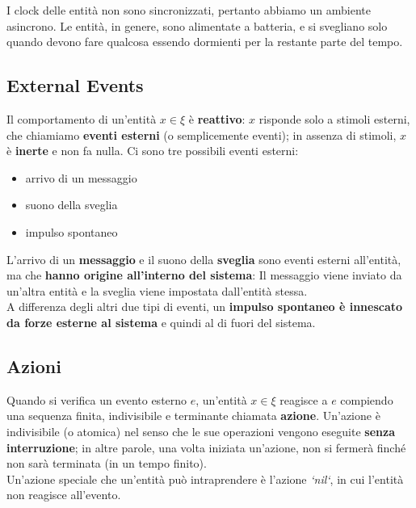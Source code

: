 I clock delle entità non sono sincronizzati, pertanto abbiamo un ambiente asincrono. Le entità, in genere, sono alimentate a batteria, e si svegliano solo quando devono fare qualcosa essendo dormienti per la restante parte del tempo.
 
\subsection*{External Events}
Il comportamento di un'entità $x \in \xi$ è \textbf{reattivo}: $x$ risponde solo a stimoli esterni, che chiamiamo \textbf{eventi esterni} (o semplicemente eventi); in assenza di stimoli, $x$ è \textbf{inerte} e non fa nulla. Ci sono tre possibili eventi esterni:
\begin{itemize}
    \item arrivo di un messaggio
    \item suono della sveglia
    \item impulso spontaneo
\end{itemize}

L'arrivo di un \textbf{messaggio} e il suono della \textbf{sveglia} sono eventi esterni all'entità, ma che \textbf{hanno origine all'interno del sistema}: Il messaggio viene inviato da un'altra entità e la sveglia viene impostata dall'entità stessa.\\
A differenza degli altri due tipi di eventi, un \textbf{impulso spontaneo è innescato da forze esterne al sistema} e quindi al di fuori del sistema.

\subsection*{Azioni}
Quando si verifica un evento esterno $e$, un'entità $x \in \xi$ reagisce a $e$ compiendo una sequenza finita, indivisibile e terminante chiamata \textbf{azione}.
Un'azione è indivisibile (o atomica) nel senso che le sue operazioni vengono eseguite \textbf{senza interruzione}; in altre parole, una volta iniziata un'azione, non si fermerà finché non sarà terminata (in un tempo finito).\\
Un'azione speciale che un'entità può intraprendere è l'azione \textit{`nil`}, in cui l'entità non reagisce all'evento.

